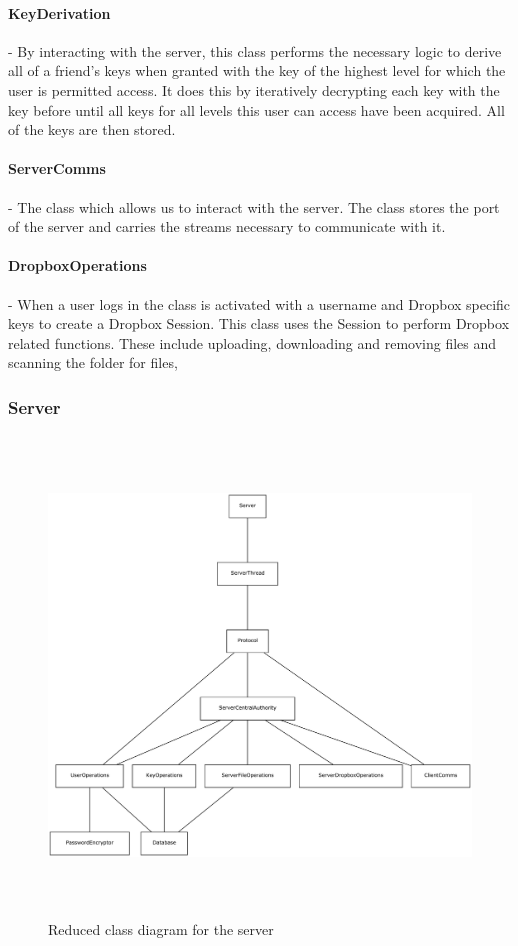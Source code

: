\documentclass[12pt, titlepage]{article}
\begin{document}
\paragraph*{KeyDerivation} - By interacting with the server, this class performs the necessary logic to derive all of a friend's keys when granted with the key of the highest level for which the user is permitted access. It does this by iteratively decrypting each key with the key before until all keys for all levels this user can access have been acquired. All of the keys are then stored.
\paragraph*{ServerComms} - The class which allows us to interact with the server. The class stores the port of the server and carries the streams necessary to communicate with it.
\paragraph*{DropboxOperations} - When a user logs in the class is activated with a username and Dropbox specific keys to create a Dropbox Session. This class uses the Session to perform Dropbox related functions. These include uploading, downloading and removing files and  scanning the folder for files, 

\subsubsection{Server}

\begin{figure}
\centerline{\includegraphics[height=5.0in,width=8in,angle=0]{server-classDiagram.pdf}}
\caption{Reduced class diagram for the server}
\label{fig:reducedServerClass}
\end{figure}
\end{document}
